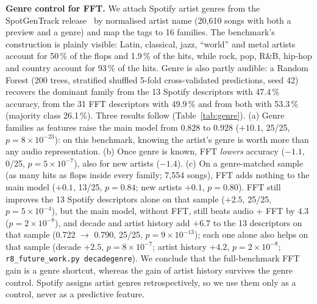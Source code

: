 \textbf{Genre control for FFT.} We attach Spotify artist genres from the SpotGenTrack
release~\cite{martingutierrez2020multimodal} by normalised artist name (20{,}610 songs
with both a preview and a genre) and map the tags to 16 families. The benchmark's
construction is plainly visible: Latin, classical, jazz, ``world'' and metal artists
account for 50\,\% of the flops and 1.9\,\% of the hits, while rock, pop, R\&B,
hip-hop and country account for 93\,\% of the hits. Genre is also partly audible: a
Random Forest (200 trees, stratified shuffled 5-fold cross-validated predictions, seed 42) recovers the dominant
family from the 13 Spotify descriptors with 47.4\,\% accuracy,
from the 31 FFT descriptors with 49.9\,\% and from both with 53.3\,\% (majority class
26.1\,\%). Three results follow (Table~\ref{tab:genre}). (a) Genre families as features
raise the main model from $0.828$ to $0.928$ ($+10.1$\pp, 25/25, $p=8\times10^{-23}$):
on this benchmark, knowing the artist's genre is worth more than any audio
representation. (b) Once genre is known, FFT \emph{lowers} accuracy ($-1.1$\pp, 0/25,
$p=5\times10^{-7}$), also for new artists ($-1.4$\pp). (c) On a genre-matched sample
(as many hits as flops inside every family; 7{,}554 songs), FFT adds nothing to the main
model ($+0.1$\pp, 13/25, $p=0.84$; new artists $+0.1$\pp, $p=0.80$). FFT still improves
the 13 Spotify descriptors alone on that sample ($+2.5$\pp, 25/25, $p=5\times10^{-4}$),
but the main model, without FFT, still beats audio + FFT by $4.3$\pp{}
($p=2\times10^{-8}$), and decade and artist history add $+6.7$\pp{} to the 13 descriptors on that sample
(0.722 $\to$ 0.790, 25/25, $p=9\times10^{-13}$); each one alone also helps on that sample (decade $+2.5$\pp,
$p=8\times10^{-7}$; artist history $+4.2$\pp, $p=2\times10^{-8}$; \texttt{r8\_future\_work.py decadegenre}). We conclude that the full-benchmark FFT gain is a genre shortcut,
whereas the gain of artist history survives the genre control. Spotify assigns artist
genres retrospectively, so we use them only as a control, never as a predictive feature.

